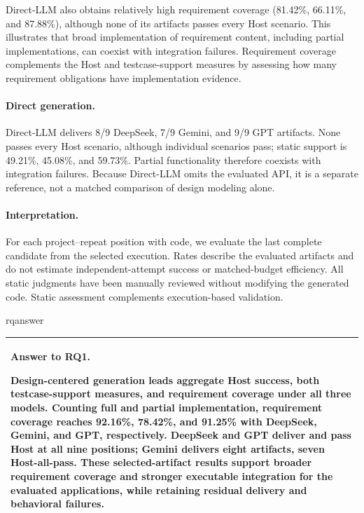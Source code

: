 Direct-LLM also obtains relatively high requirement coverage (81.42\%, 66.11\%, and 87.88\%), although none of its artifacts passes every Host scenario. This illustrates that broad implementation of requirement content, including partial implementations, can coexist with integration failures. Requirement coverage complements the Host and testcase-support measures by assessing how many requirement obligations have implementation evidence.

\paragraph{Direct generation.}
Direct-LLM delivers 8/9 DeepSeek, 7/9 Gemini, and 9/9 GPT artifacts. None passes every Host scenario, although individual scenarios pass; static support is 49.21\%, 45.08\%, and 59.73\%. Partial functionality therefore coexists with integration failures. Because Direct-LLM omits the evaluated API, it is a separate reference, not a matched comparison of design modeling alone.

\paragraph{Interpretation.}
For each project--repeat position with code, we evaluate the last complete candidate from the selected execution. Rates describe the evaluated artifacts and do not estimate independent-attempt success or matched-budget efficiency. All static judgments have been manually reviewed without modifying the generated code. Static assessment complements execution-based validation.


\ifcsname rqanswer\endcsname\else
\newenvironment{rqanswer}[1]{%
  \par\smallskip\noindent
  \begin{tabular}{|p{\dimexpr\linewidth-2\tabcolsep-2\arrayrulewidth\relax}|}
  \hline\textbf{Answer to RQ#1.}\ignorespaces
}{\\\hline\end{tabular}\par\smallskip}
\fi
\begin{rqanswer}{1}
Design-centered generation leads aggregate Host success, both testcase-support measures, and requirement coverage under all three models. Counting full and partial implementation, requirement coverage reaches 92.16\%, 78.42\%, and 91.25\% with DeepSeek, Gemini, and GPT, respectively. DeepSeek and GPT deliver and pass Host at all nine positions; Gemini delivers eight artifacts, seven Host-all-pass. These selected-artifact results support broader requirement coverage and stronger executable integration for the evaluated applications, while retaining residual delivery and behavioral failures.
\end{rqanswer}
